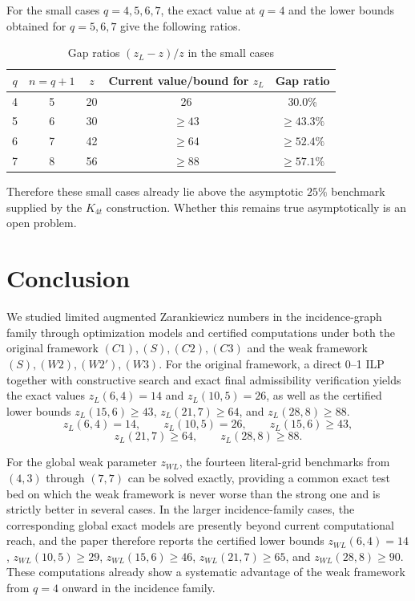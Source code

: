 \documentclass[10pt]{article}
\newcommand{\blue}[1]{#1}
\newcommand{\0}{\mathbf{0}}
\newcommand{\1}{\mathbf{1}}
\begin{document}
\blue{For the small cases \(q=4,5,6,7\), the exact value at \(q=4\) and the lower bounds obtained for \(q=5,6,7\) give the following ratios.}

\begin{table}[htbp]
\centering
\caption{Gap ratios \((z_L-z)/z\) in the small cases}
\label{tab:ratio}
\begin{tabular}{|c|c|c|c|c|}
\hline
\(q\) & \(n=q+1\) & \(z\) & Current value/bound for \(z_L\) & Gap ratio \\ \hline
4 & 5 & 20 & 26 & 30.0\% \\
5 & 6 & 30 & \(\ge 43\) & \(\ge 43.3\%\) \\
6 & 7 & 42 & \(\ge 64\) & \(\ge 52.4\%\) \\
7 & 8 & 56 & \(\ge 88\) & \(\ge 57.1\%\) \\ \hline
\end{tabular}
\end{table}

\blue{Therefore these small cases already lie above the asymptotic \(25\%\) benchmark supplied by the \(K_{4t}\) construction. Whether this remains true asymptotically is an open problem.}

\section{Conclusion}

\blue{We studied limited augmented Zarankiewicz numbers in the incidence-graph family through optimization models and certified computations under both the original framework \((C1),(S),(C2),(C3)\) and the weak framework \((S),(W2),(W2'),(W3)\). For the original framework, a direct 0--1 ILP together with constructive search and exact final admissibility verification yields the exact values \(z_L(6,4)=14\) and \(z_L(10,5)=26\), as well as the certified lower bounds \(z_L(15,6)\ge 43\), \(z_L(21,7)\ge 64\), and \(z_L(28,8)\ge 88\).}
\[
\blue{z_L(6,4)=14,\qquad z_L(10,5)=26,\qquad z_L(15,6)\ge 43,}
\]
\[
\blue{z_L(21,7)\ge 64,\qquad z_L(28,8)\ge 88.}
\]

\blue{For the global weak parameter \(z_{WL}\), the fourteen literal-grid benchmarks from \((4,3)\) through \((7,7)\) can be solved exactly, providing a common exact test bed on which the weak framework is never worse than the strong one and is strictly better in several cases. In the larger incidence-family cases, the corresponding global exact models are presently beyond current computational reach, and the paper therefore reports the certified lower bounds \(z_{WL}(6,4)=14\), \(z_{WL}(10,5)\ge 29\), \(z_{WL}(15,6)\ge 46\), \(z_{WL}(21,7)\ge 65\), and \(z_{WL}(28,8)\ge 90\). These computations already show a systematic advantage of the weak framework from \(q=4\) onward in the incidence family.}
\end{document}
